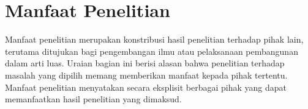\section{Manfaat Penelitian}
Manfaat penelitian merupakan konstribusi hasil penelitian terhadap pihak lain, terutama ditujukan bagi pengembangan ilmu atau pelaksanaan pembangunan dalam arti luas. Uraian bagian ini berisi alasan  bahwa penelitian terhadap masalah yang dipilih memang memberikan manfaat kepada pihak tertentu. Manfaat penelitian  menyatakan secara eksplisit berbagai pihak yang dapat memanfaatkan hasil penelitian yang dimaksud.